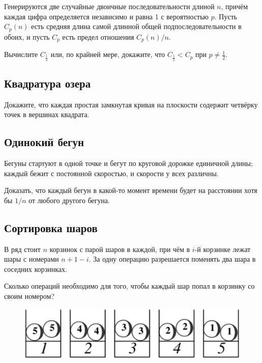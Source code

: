 {

\sloppy

Генерируются две случайные двоичные последовательности длиной $n$, причём каждая цифра определяется независимо и равна 1 с вероятностью $p$.
Пусть $C_p(n)$ есть средняя длина самой длинной общей подпоследовательности в обоих, и пусть $C_p$ есть предел отношения $C_p(n)/n$.

}

Вычислите $C_{\frac12}$ или, по крайней мере, докажите, что $C_{\frac12}<C_{p}$ при $p\ne\tfrac12$.

\subsection*{Квадратура озера}

Докажите, что каждая простая замкнутая кривая на плоскости содержит четвёрку точек в вершинах квадрата.

\subsection*{Одинокий бегун}

Бегуны  стартуют в одной точке и бегут по круговой дорожке единичной длины;
каждый бежит с постоянной скоростью, и скорости у всех различны.

Доказать, что каждый бегун в какой-то момент времени будет на расстоянии хотя бы $1/n$ от любого другого бегуна.

\subsection*{Сортировка шаров}

В ряд стоит $n$ корзинок с парой шаров в каждой, при чём в $i$-й корзинке лежат шары с номерами $n+1-i$.
За одну операцию разрешается поменять два шара в соседних корзинках.

Сколько операций необходимо для того, чтобы каждый шар попал в корзинку со своим номером?

\begin{figure}[h!]
\centering
\includegraphics[scale=0.5]{Figs/UnsolvedPuzzles/bins}
\end{figure}

